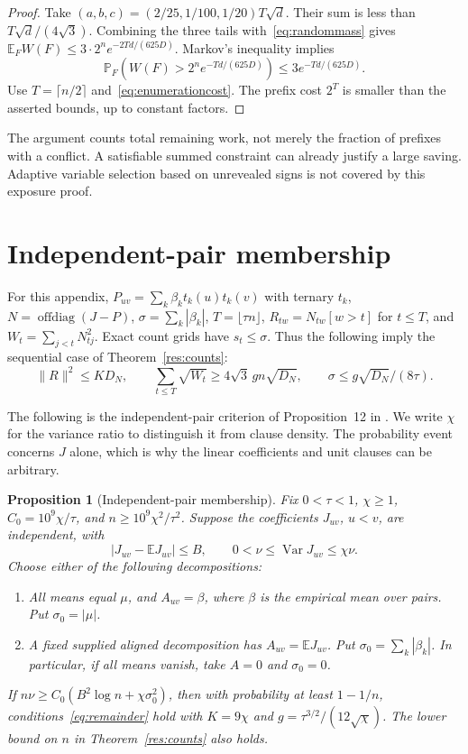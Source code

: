 \documentclass[11pt,a4paper]{article}
\newtheorem{proposition}[theorem]{Proposition}
\theoremstyle{definition}
\theoremstyle{remark}
\newcommand{\E}{\mathbb E}
\newcommand{\Prb}{\mathbb P}
\begin{document}
\begin{proof}
Take $(a,b,c)=(2/25,1/100,1/20)T\sqrt d$. Their sum is less than
$T\sqrt d/(4\sqrt3)$. Combining the three tails with~\eqref{eq:randommass}
gives $\E_F W(F)\le3\cdot2^n e^{-2Td/(625D)}$.
Markov's inequality implies
\[
 \Prb_F\left(W(F)>2^n e^{-Td/(625D)}\right)
 \le3e^{-Td/(625D)}.
\]
Use $T=\lceil n/2\rceil$ and~\eqref{eq:enumerationcost}. The prefix cost
$2^T$ is smaller than the asserted bounds, up to constant factors.
\end{proof}

The argument counts total remaining work, not merely the fraction of prefixes
with a conflict. A satisfiable summed constraint can already justify a large
saving. Adaptive variable selection based on unrevealed signs is not covered
by this exposure proof.

\section{Independent-pair membership}\label{app:membership}

For this appendix, $P_{uv}=\sum_k\beta_kt_k(u)t_k(v)$ with ternary
$t_k$, $N=\operatorname{offdiag}(J-P)$, $\sigma=\sum_k|\beta_k|$,
$T=\lfloor\tau n\rfloor$, $R_{tw}=N_{tw}[w>t]$ for $t\le T$, and
$W_t=\sum_{j<t}N_{tj}^2$. Exact count grids have $s_t\le\sigma$.
Thus the following imply the sequential case of Theorem~\ref{res:counts}:
\begin{equation}
 \|R\|^2\le KD_N,\qquad
 \sum_{t\le T}\sqrt{W_t}\ge4\sqrt3\,gn\sqrt{D_N},\qquad
 \sigma\le g\sqrt{D_N}/(8\tau).\label{eq:remainder}
\end{equation}

The following is the independent-pair criterion of Proposition~12 in
\cite{NoteCounts}. We write $\chi$ for the variance ratio to distinguish
it from clause density. The probability event concerns $J$ alone, which is
why the linear coefficients and unit clauses can be arbitrary.

\begin{proposition}[Independent-pair membership]\label{prop:pairmembership}
Fix $0<\tau<1$, $\chi\ge1$, $C_0=10^9\chi/\tau$, and
$n\ge10^9\chi^2/\tau^2$. Suppose the coefficients $J_{uv}$, $u<v$, are
independent, with
\[
 |J_{uv}-\E J_{uv}|\le B,\qquad
 0<\nu\le\operatorname{Var}J_{uv}\le\chi\nu.
\]
Choose either of the following decompositions:
\begin{enumerate}
\item All means equal $\mu$, and $A_{uv}=\beta$, where $\beta$ is the
empirical mean over pairs. Put $\sigma_0=|\mu|$.
\item A fixed supplied aligned decomposition has $A_{uv}=\E J_{uv}$.
Put $\sigma_0=\sum_k|\beta_k|$. In particular, if all means vanish,
take $A=0$ and $\sigma_0=0$.
\end{enumerate}
If $n\nu\ge C_0(B^2\log n+\chi\sigma_0^2)$, then with probability at least
$1-1/n$, conditions~\eqref{eq:remainder} hold with
$K=9\chi$ and $g=\tau^{3/2}/(12\sqrt\chi)$.
The lower bound on $n$ in Theorem~\ref{res:counts} also holds.
\end{proposition}
\end{document}
